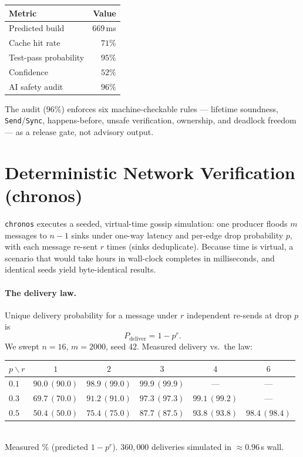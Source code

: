\documentclass[11pt]{article}
\begin{document}
\begin{center}
\begin{tabular}{lr}
\toprule
Metric & Value \\
\midrule
Predicted build & $669$\,ms \\
Cache hit rate & $71\%$ \\
Test-pass probability & $95\%$ \\
Confidence & $52\%$ \\
AI safety audit & $96\%$ \\
\bottomrule
\end{tabular}
\end{center}

The audit ($96\%$) enforces six machine-checkable rules --- lifetime soundness,
\texttt{Send}/\texttt{Sync}, happens-before, unsafe verification, ownership, and
deadlock freedom --- as a release gate, not advisory output.

\section{Deterministic Network Verification (chronos)}
\texttt{chronos} executes a seeded, virtual-time gossip simulation: one producer floods
$m$ messages to $n-1$ sinks under one-way latency and per-edge drop probability $p$,
with each message re-sent $r$ times (sinks deduplicate). Because time is virtual, a
scenario that would take hours in wall-clock completes in milliseconds, and identical
seeds yield byte-identical results.

\paragraph{The delivery law.} Unique delivery probability for a message under $r$
independent re-sends at drop $p$ is
\[
P_{\text{deliver}} = 1 - p^{r}.
\]
We swept $n=16$, $m=2000$, seed $42$. Measured delivery vs.\ the law:

\begin{center}
\begin{tabular}{lccccc}
\toprule
$p \backslash r$ & $1$ & $2$ & $3$ & $4$ & $6$ \\
\midrule
$0.1$ & $90.0\,(90.0)$ & $98.9\,(99.0)$ & $99.9\,(99.9)$ & --- & --- \\
$0.3$ & $69.7\,(70.0)$ & $91.2\,(91.0)$ & $97.3\,(97.3)$ & $99.1\,(99.2)$ & --- \\
$0.5$ & $50.4\,(50.0)$ & $75.4\,(75.0)$ & $87.7\,(87.5)$ & $93.8\,(93.8)$ & $98.4\,(98.4)$ \\
\bottomrule
\end{tabular}\\[2pt]
{\small Measured \% (predicted $1-p^{r}$). $360{,}000$ deliveries simulated in
$\approx 0.96$\,s wall.}
\end{center}
\end{document}
